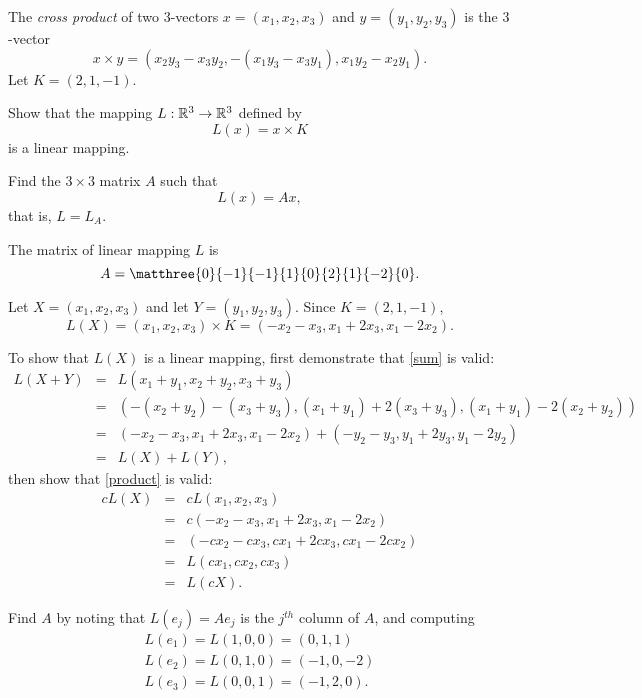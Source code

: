 \documentclass{article}
\begin{document}
\begin{exercise} \label{c4.3.8}
The {\em cross product\/} of two $3$-vectors $x=(x_1,x_2,x_3)$
and $y=(y_1,y_2,y_3)$ is the $3$-vector
\[
x\times y = (x_2y_3-x_3y_2,-(x_1y_3-x_3y_1),x_1y_2-x_2y_1).
\]
Let $K=(2,1,-1)$.  
\begin{enumeratea}
\item Show that the mapping $L:\mathbb R^3\to\mathbb R^3$ defined by
\[
L(x) = x\times K
\]
is a linear mapping.  
\item Find the $3\times 3$ matrix $A$ such that
\[
L(x) = Ax,
\]
that is, $L=L_A$.
\end{enumeratea}
\begin{solution}

\ans The matrix of linear mapping $L$ is
\[
A = \matthree{0}{-1}{-1}{1}{0}{2}{1}{-2}{0}.
\]

\soln Let $X = (x_1,x_2,x_3)$ and let $Y = (y_1,y_2,y_3)$.  
Since $K = (2,1,-1)$,
\[
L(X) = (x_1,x_2,x_3) \times K = 
(-x_2 - x_3, x_1 + 2x_3, x_1 - 2x_2).
\]

To show that $L(X)$ is a linear mapping, first demonstrate that
\eqref{sum} is valid:
\[
\begin{array}{rcl}
L(X + Y) & = & L(x_1 + y_1,x_2 + y_2,x_3 + y_3) \\
& = & (-(x_2 + y_2) - (x_3 + y_3), (x_1 + y_1) + 2(x_3 + y_3),
(x_1 + y_1) - 2(x_2 + y_2)) \\
& = & (-x_2 - x_3, x_1 + 2x_3, x_1 - 2x_2) +
(-y_2 - y_3, y_1 + 2y_3, y_1 - 2y_2) \\
& = & L(X) + L(Y), \end{array}
\]
then show that \eqref{product} is valid:
\[
\begin{array}{rcl}
cL(X) & = & cL(x_1,x_2,x_3) \\
& = & c(-x_2 - x_3, x_1 + 2x_3, x_1 - 2x_2) \\
& = & (-cx_2 - cx_3, cx_1 + 2cx_3, cx_1 - 2cx_2) \\
& = & L(cx_1,cx_2,cx_3) \\
& = & L(cX). \end{array}
\]

Find $A$ by noting that $L(e_j) = Ae_j$ is the $j^{th}$ column of $A$,
and computing
\[ \begin{array}{l}
L(e_1) = L(1,0,0) = (0,1,1) \\
L(e_2) = L(0,1,0) = (-1,0,-2) \\
L(e_3) = L(0,0,1) = (-1,2,0). \end{array} \]


\end{solution}
\end{exercise}
\end{document}
